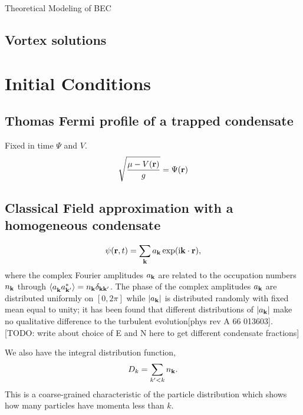 \begin{chapter}{\label{cha:theoretical_model}Theoretical Modeling of BEC}
	\subsection{\label{section:vortices} Vortex solutions}
\section{\label{section:inital} Initial Conditions}
	\subsection{\label{section:tftrap} Thomas Fermi profile of a trapped condensate}
	Fixed in time $\Psi$ and $V$.
	\begin{equation}
	\sqrt{\frac{\mu - V({\bf r})}{g}} =  \Psi({\bf r})
	\label{eq:TF}
	\end{equation}
	\subsection{\label{section:cfield} Classical Field approximation with a homogeneous condensate}
		\begin{equation}
		\psi({\bf r},t) = \sum_{\bf k} a_{\bf k} \exp (\mathrm{i}{\bf k}\cdot{\bf r}),
		\label{eq:cFieldIC}
		\end{equation}
		where the complex Fourier amplitudes $a_{\bf k}$ are related to the occupation numbers $n_{\bf k}$ through $\braket{a_{\bf k}^{\,}a_{\bf k'}^*} = n_{\bf k}\delta_{\bf kk'}$. The phase of the complex amplitudes $a_{\bf k}$ are distributed uniformly on $[0,2\pi]$ while $|a_{\bf k}|$ is distributed randomly with fixed mean equal to unity; it has been found that different distributions of $|a_{\bf k}|$ make no qualitative difference to the turbulent evolution[phys rev A 66 013603]. [TODO: write about choice of E and N here to get different condensate fractions]

		We also have the integral distribution function,
		\begin{equation}
		D_k = \sum_{k'<k}n_{\bf k}.
		\label{eq:intDistFunc}
		\end{equation}
		This is a coarse-grained characteristic of the particle distribution which shows how many particles have momenta less than $k$.
\end{chapter}
